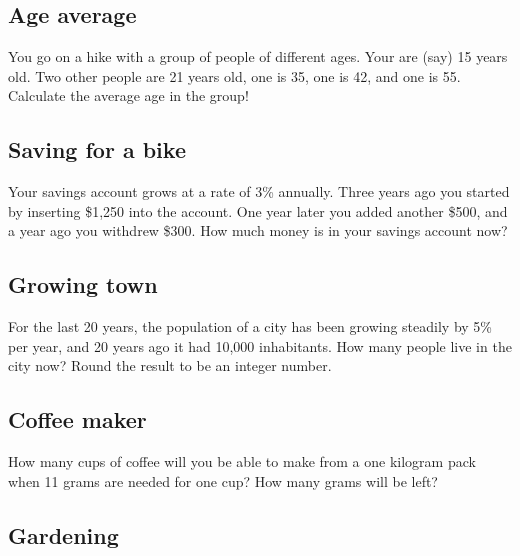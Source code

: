 
\subsection{Age average}

You go on a hike with a group of people of different 
ages. Your are (say) 15 years old. Two other people 
are 21 years old, one is 35, one is 42, and one is 55.
Calculate the average age in the group!


\subsection{Saving for a bike}

Your savings account grows at a rate of 3\% annually. Three years ago you 
started by inserting \$1,250 into the account. One year later 
you added another \$500, and a year ago you withdrew \$300. 
How much money is in your savings account now?


\subsection{Growing town}

For the last 20 years, the population of a city has been growing 
steadily by 5\% per year, and 20 years ago it had 10,000 inhabitants.
How many people live in the city now? Round the result to be an 
integer number.


\subsection{Coffee maker}

How many cups of coffee will you be able to make from a one kilogram
pack when 11 grams are needed for one cup? How many grams will be 
left?


\subsection{Gardening}

